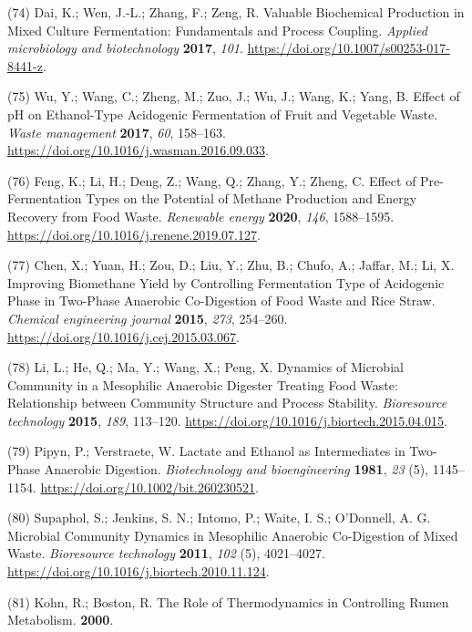 \documentclass[11pt]{report}
\begin{document}
\hypertarget{citeproc_bib_item_74}{(74) Dai, K.; Wen, J.-L.; Zhang, F.; Zeng, R. Valuable Biochemical Production in Mixed Culture Fermentation: Fundamentals and Process Coupling. \textit{Applied microbiology and biotechnology} \textbf{2017}, \textit{101}. \url{https://doi.org/10.1007/s00253-017-8441-z}.}

\hypertarget{citeproc_bib_item_75}{(75) Wu, Y.; Wang, C.; Zheng, M.; Zuo, J.; Wu, J.; Wang, K.; Yang, B. Effect of pH on Ethanol-Type Acidogenic Fermentation of Fruit and Vegetable Waste. \textit{Waste management} \textbf{2017}, \textit{60}, 158–163. \url{https://doi.org/10.1016/j.wasman.2016.09.033}.}

\hypertarget{citeproc_bib_item_76}{(76) Feng, K.; Li, H.; Deng, Z.; Wang, Q.; Zhang, Y.; Zheng, C. Effect of Pre-Fermentation Types on the Potential of Methane Production and Energy Recovery from Food Waste. \textit{Renewable energy} \textbf{2020}, \textit{146}, 1588–1595. \url{https://doi.org/10.1016/j.renene.2019.07.127}.}

\hypertarget{citeproc_bib_item_77}{(77) Chen, X.; Yuan, H.; Zou, D.; Liu, Y.; Zhu, B.; Chufo, A.; Jaffar, M.; Li, X. Improving Biomethane Yield by Controlling Fermentation Type of Acidogenic Phase in Two-Phase Anaerobic Co-Digestion of Food Waste and Rice Straw. \textit{Chemical engineering journal} \textbf{2015}, \textit{273}, 254–260. \url{https://doi.org/10.1016/j.cej.2015.03.067}.}

\hypertarget{citeproc_bib_item_78}{(78) Li, L.; He, Q.; Ma, Y.; Wang, X.; Peng, X. Dynamics of Microbial Community in a Mesophilic Anaerobic Digester Treating Food Waste: Relationship between Community Structure and Process Stability. \textit{Bioresource technology} \textbf{2015}, \textit{189}, 113–120. \url{https://doi.org/10.1016/j.biortech.2015.04.015}.}

\hypertarget{citeproc_bib_item_79}{(79) Pipyn, P.; Verstraete, W. Lactate and Ethanol as Intermediates in Two-Phase Anaerobic Digestion. \textit{Biotechnology and bioengineering} \textbf{1981}, \textit{23} (5), 1145–1154. \url{https://doi.org/10.1002/bit.260230521}.}

\hypertarget{citeproc_bib_item_80}{(80) Supaphol, S.; Jenkins, S. N.; Intomo, P.; Waite, I. S.; O’Donnell, A. G. Microbial Community Dynamics in Mesophilic Anaerobic Co-Digestion of Mixed Waste. \textit{Bioresource technology} \textbf{2011}, \textit{102} (5), 4021–4027. \url{https://doi.org/10.1016/j.biortech.2010.11.124}.}

\hypertarget{citeproc_bib_item_81}{(81) Kohn, R.; Boston, R. The Role of Thermodynamics in Controlling Rumen Metabolism. \textbf{2000}.}
\end{document}
